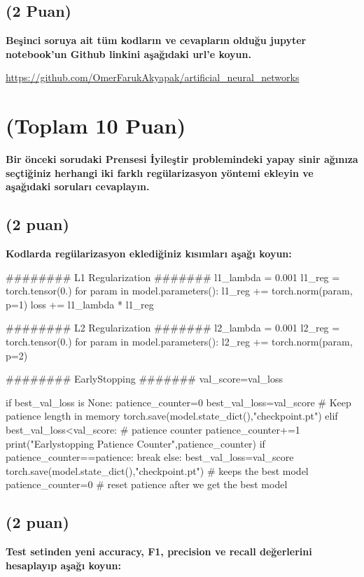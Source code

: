 \documentclass[11pt]{article}
\begin{document}
\subsection{(2 Puan)} \textbf{Beşinci soruya ait tüm kodların ve cevapların olduğu jupyter notebook'un Github linkini aşağıdaki url'e koyun.}

\url{https://github.com/OmerFarukAkyapak/artificial_neural_networks}

\section{(Toplam 10 Puan)} \textbf{Bir önceki sorudaki Prensesi İyileştir problemindeki yapay sinir ağınıza seçtiğiniz herhangi iki farklı regülarizasyon yöntemi ekleyin ve aşağıdaki soruları cevaplayın.} 

\subsection{(2 puan)} \textbf{Kodlarda regülarizasyon eklediğiniz kısımları aşağı koyun:} 

\begin{python}
######## L1 Regularization #######
        l1_lambda = 0.001
        l1_reg = torch.tensor(0.)
        for param in model.parameters():
            l1_reg += torch.norm(param, p=1)
        loss += l1_lambda * l1_reg
        
######## L2 Regularization #######
        l2_lambda = 0.001
        l2_reg = torch.tensor(0.)
        for param in model.parameters():
            l2_reg += torch.norm(param, p=2)
            

######## EarlyStopping #######
        val_score=val_loss

        if best_val_loss is None:
          patience_counter=0
          best_val_loss=val_score       # Keep patience length in memory
          torch.save(model.state_dict(),"checkpoint.pt")
        elif best_val_loss<val_score:     # patience counter
          patience_counter+=1
          print("Earlystopping Patience Counter",patience_counter)
          if patience_counter==patience:           
            break
        else:
          best_val_loss=val_score
          torch.save(model.state_dict(),"checkpoint.pt")        # keeps the best model
          patience_counter=0        # reset patience after we get the best model
        
\end{python}

\subsection{(2 puan)} \textbf{Test setinden yeni accuracy, F1, precision ve recall değerlerini hesaplayıp aşağı koyun:}
\end{document}
